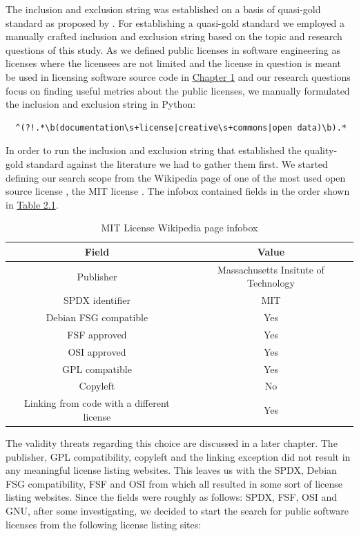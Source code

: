 The inclusion and exclusion string was established on a basis of quasi-gold standard as proposed by \cite{qgs}. For establishing a quasi-gold standard we employed a manually crafted inclusion and exclusion string based on the topic and research questions of this study. As we defined public licenses in software engineering as licenses where the licensees are not limited and the license in question is meant be used in licensing software source code in \hyperref[intro]{Chapter 1} and our research questions focus on finding useful metrics about the public licenses, we manually formulated the inclusion and exclusion string in Python:
\begin{verbatim}
  ^(?!.*\b(documentation\s+license|creative\s+commons|open data)\b).*
\end{verbatim}
In order to run the inclusion and exclusion string that established the quality-gold standard against the literature we had to gather them first. We started defining our search scope from the Wikipedia page of one of the most used open source license \citep{github:licenseusage}, the MIT license \citep{wikipedia:mit}. The infobox contained fields in the order shown in \hyperref[table:infobox]{Table 2.1}.

\begin{table}[t]
	\begin{center}
		\begin{tabular}{||c c||}
			\hline
			Field & Value \\
			\hline
			Publisher & Massachusetts Insitute of Technology \\
			SPDX identifier & MIT \\
			Debian FSG compatible & Yes \\
			FSF approved & Yes \\
			OSI approved & 	Yes \\
			GPL compatible & Yes \\
			Copyleft & No \\
			Linking from code with a different license & Yes \\
			\hline
		\end{tabular}
		\caption{MIT License Wikipedia page infobox}
		\label{table:infobox}
	\end{center}
\end{table}
The validity threats regarding this choice are discussed in a later chapter. The publisher, GPL compatibility, copyleft and the linking exception did not result in any meaningful license listing websites. This leaves us with the SPDX, Debian FSG compatibility, FSF and OSI from which all resulted in some sort of license listing websites. Since the fields were roughly as follows: SPDX, FSF, OSI and GNU, after some investigating, we decided to start the search for public software licenses from the following license listing sites:

